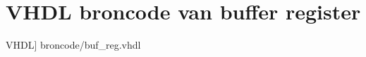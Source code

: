 \section[Buffer register with flag FF]{VHDL broncode van buffer register}\label{appdix:buf} 
	\scriptsize
	 VHDL] {broncode/buf_reg.vhdl}
	\normalsize

